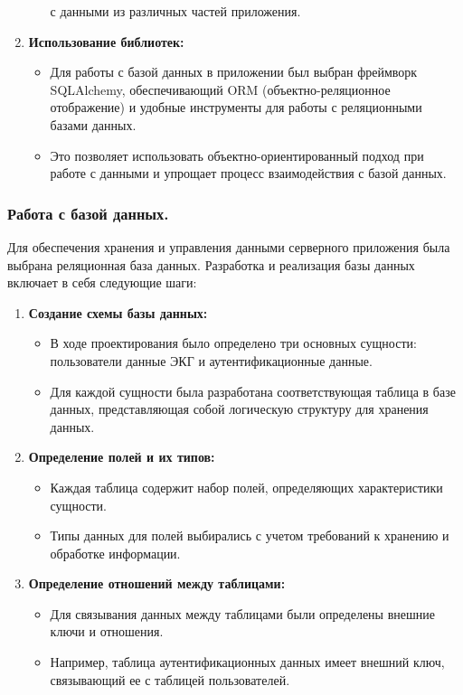 \documentclass[12pt, russian]{extarticle}
\begin{document}
\begin{spacing}{1.5}
\begin{enumerate}
\begin{itemize}
                    с данными из различных частей приложения.
            \end{itemize}
        \item \textbf{Использование библиотек:}
            \begin{itemize}
                \item Для работы с базой данных в приложении был выбран фреймворк SQLAlchemy,
                    обеспечивающий ORM (объектно-реляционное отображение) и удобные инструменты для работы
                    с реляционными базами данных.
                \item Это позволяет использовать объектно-ориентированный подход при работе с данными
                    и упрощает процесс взаимодействия с базой данных.
            \end{itemize}
    \end{enumerate}

    \subsubsection{Работа с базой данных.}

    Для обеспечения хранения и управления данными серверного приложения была
    выбрана реляционная база данных. Разработка и реализация базы данных включает в себя следующие шаги:

    \begin{enumerate}
        \item \textbf{Создание схемы базы данных:}
            \begin{itemize}
                \item В ходе проектирования было определено три основных сущности: пользователи
                    данные ЭКГ и аутентификационные данные.
                \item Для каждой сущности была разработана соответствующая таблица в базе данных,
                    представляющая собой логическую структуру для хранения данных.
            \end{itemize}
        \item \textbf{Определение полей и их типов:}
            \begin{itemize}
                \item Каждая таблица содержит набор полей, определяющих характеристики сущности.
                \item Типы данных для полей выбирались с учетом требований к хранению и обработке информации.
            \end{itemize}
        \item \textbf{Определение отношений между таблицами:}
            \begin{itemize}
                \item Для связывания данных между таблицами были определены внешние ключи и отношения.
                \item Например, таблица аутентификационных данных имеет внешний ключ, связывающий ее с таблицей пользователей.
            \end{itemize}
    \end{enumerate}


\end{spacing}
\end{document}
